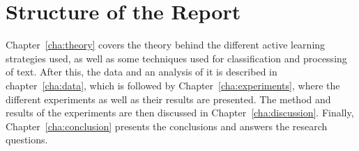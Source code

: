 \section{Structure of the Report}
\label{sec:structure}

Chapter~\ref{cha:theory} covers the theory behind the different active learning strategies used, as well as some techniques used for classification and processing of text.
After this, the data and an analysis of it is described in chapter~\ref{cha:data}, which is followed by Chapter~\ref{cha:experiments}, where the different experiments as well as their results are presented.
The method and results of the experiments are then discussed in Chapter~\ref{cha:discussion}.
Finally, Chapter~\ref{cha:conclusion} presents the conclusions and answers the research questions.

